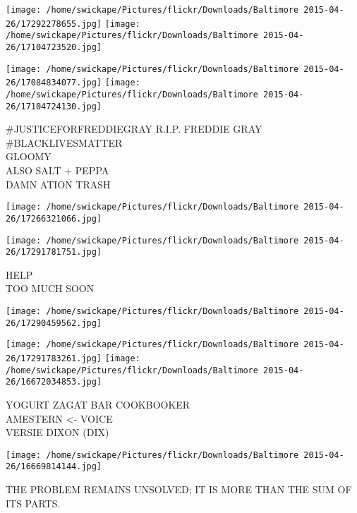 \documentclass[10pt,letterpaper]{article}
\begin{document}
\texttt{[image: /home/swickape/Pictures/flickr/Downloads/Baltimore 2015-04-26/17292278655.jpg]}
\texttt{[image: /home/swickape/Pictures/flickr/Downloads/Baltimore 2015-04-26/17104723520.jpg]}

\texttt{[image: /home/swickape/Pictures/flickr/Downloads/Baltimore 2015-04-26/17084834077.jpg]}
\texttt{[image: /home/swickape/Pictures/flickr/Downloads/Baltimore 2015-04-26/17104724130.jpg]}

\#JUSTICEFORFREDDIEGRAY R.I.P. FREDDIE GRAY \#BLACKLIVESMATTER\\
GLOOMY\\
ALSO SALT + PEPPA\\
DAMN ATION TRASH\\
\pagebreak

\texttt{[image: /home/swickape/Pictures/flickr/Downloads/Baltimore 2015-04-26/17266321066.jpg]}

\vspace{0.25in}
\texttt{[image: /home/swickape/Pictures/flickr/Downloads/Baltimore 2015-04-26/17291781751.jpg]}

HELP\\
TOO MUCH SOON\\
\pagebreak

\texttt{[image: /home/swickape/Pictures/flickr/Downloads/Baltimore 2015-04-26/17290459562.jpg]}

\vspace{0.25in}
\texttt{[image: /home/swickape/Pictures/flickr/Downloads/Baltimore 2015-04-26/17291783261.jpg]}
\texttt{[image: /home/swickape/Pictures/flickr/Downloads/Baltimore 2015-04-26/16672034853.jpg]}

YOGURT ZAGAT BAR COOKBOOKER\\
AMESTERN <{-} VOICE\\
VERSIE DIXON (DIX)\\
\pagebreak

\texttt{[image: /home/swickape/Pictures/flickr/Downloads/Baltimore 2015-04-26/16669814144.jpg]}

THE PROBLEM REMAINS UNSOLVED; IT IS MORE THAN THE SUM OF ITS PARTS.\\
\pagebreak
\end{document}
